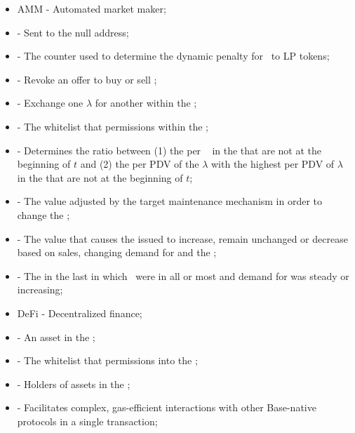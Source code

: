 \documentclass[class=article, crop=false]{standalone}
\begin{document}
\begin{itemize}[topsep=0pt, itemsep=2pt,leftmargin=16pt]
    \item[] AMM - Automated market maker;
    \item[]  - Sent to the null address;
    \item[]  - The counter used to determine the dynamic  penalty for   \Pinto\ to  LP tokens;
    \item[]  - Revoke an offer to buy or sell ;
    \item[]  - Exchange one  $\lambda$ for another within the ;
    \item[]  - The whitelist that permissions  within the ;
    \item[]  - Determines the ratio between (1) the  per \Pinto\  in the  that are not  at the beginning of $t$ and (2) the  per PDV of the $\lambda$ with the highest  per PDV of $\lambda$  in the  that are not  at the beginning of $t$;
    \item[]  - The value adjusted by the target maintenance mechanism in order to change the ;
    \item[]  - The value that causes the  issued to increase, remain unchanged or decrease based on  sales, changing demand for  and the ;
    \item[]  - The  in the last  in which \Pinto\ were  in all or most  and demand for  was steady or increasing;
    \item[] DeFi - Decentralized finance;
    \item[]  - An asset in the ;
    \item[]  - The whitelist that permissions  into the ;
    \item[]  - Holders of  assets in the ;
    \item[]  - Facilitates complex, gas-efficient interactions with other Base-native protocols in a single transaction;

\end{itemize}
\end{document}
